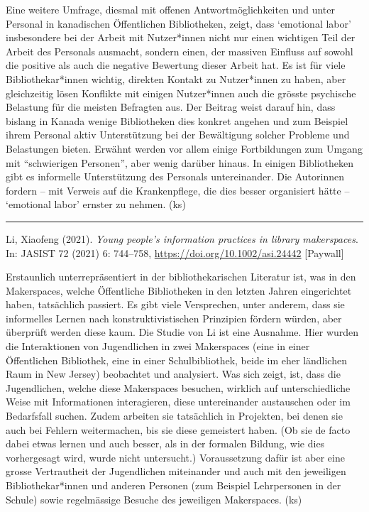 \documentclass[a4paper,
fontsize=11pt,
oneside,
numbers=noperiodatend,
parskip=half-,
bibliography=totoc,
final
]{scrartcl}
\begin{document}
Eine weitere Umfrage, diesmal mit offenen Antwortmöglichkeiten und unter
Personal in kanadischen Öffentlichen Bibliotheken, zeigt, dass
\enquote*{emotional labor} insbesondere bei der Arbeit mit Nutzer*innen
nicht nur einen wichtigen Teil der Arbeit des Personals ausmacht,
sondern einen, der massiven Einfluss auf sowohl die positive als auch
die negative Bewertung dieser Arbeit hat. Es ist für viele
Bibliothekar*innen wichtig, direkten Kontakt zu Nutzer*innen zu haben,
aber gleichzeitig lösen Konflikte mit einigen Nutzer*innen auch die
grösste psychische Belastung für die meisten Befragten aus. Der Beitrag
weist darauf hin, dass bislang in Kanada wenige Bibliotheken dies
konkret angehen und zum Beispiel ihrem Personal aktiv Unterstützung bei
der Bewältigung solcher Probleme und Belastungen bieten. Erwähnt werden
vor allem einige Fortbildungen zum Umgang mit \enquote{schwierigen
Personen}, aber wenig darüber hinaus. In einigen Bibliotheken gibt es
informelle Unterstützung des Personals untereinander. Die Autorinnen
fordern -- mit Verweis auf die Krankenpflege, die dies besser
organisiert hätte -- \enquote*{emotional labor} ernster zu nehmen. (ks)

\begin{center}\rule{0.5\linewidth}{0.5pt}\end{center}

Li, Xiaofeng (2021). \emph{Young people's information practices in
library makerspaces}. In: JASIST 72 (2021) 6: 744--758,
\url{https://doi.org/10.1002/asi.24442} {[}Paywall{]}

Erstaunlich unterrepräsentiert in der bibliothekarischen Literatur ist,
was in den Makerspaces, welche Öffentliche Bibliotheken in den letzten
Jahren eingerichtet haben, tatsächlich passiert. Es gibt viele
Versprechen, unter anderem, dass sie informelles Lernen nach
konstruktivistischen Prinzipien fördern würden, aber überprüft werden
diese kaum. Die Studie von Li ist eine Ausnahme. Hier wurden die
Interaktionen von Jugendlichen in zwei Makerspaces (eine in einer
Öffentlichen Bibliothek, eine in einer Schulbibliothek, beide im eher
ländlichen Raum in New Jersey) beobachtet und analysiert. Was sich
zeigt, ist, dass die Jugendlichen, welche diese Makerspaces besuchen,
wirklich auf unterschiedliche Weise mit Informationen interagieren,
diese untereinander austauschen oder im Bedarfsfall suchen. Zudem
arbeiten sie tatsächlich in Projekten, bei denen sie auch bei Fehlern
weitermachen, bis sie diese gemeistert haben. (Ob sie de facto dabei
etwas lernen und auch besser, als in der formalen Bildung, wie dies
vorhergesagt wird, wurde nicht untersucht.) Voraussetzung dafür ist aber
eine grosse Vertrautheit der Jugendlichen miteinander und auch mit den
jeweiligen Bibliothekar*innen und anderen Personen (zum Beispiel
Lehrpersonen in der Schule) sowie regelmässige Besuche des jeweiligen
Makerspaces. (ks)
\end{document}
